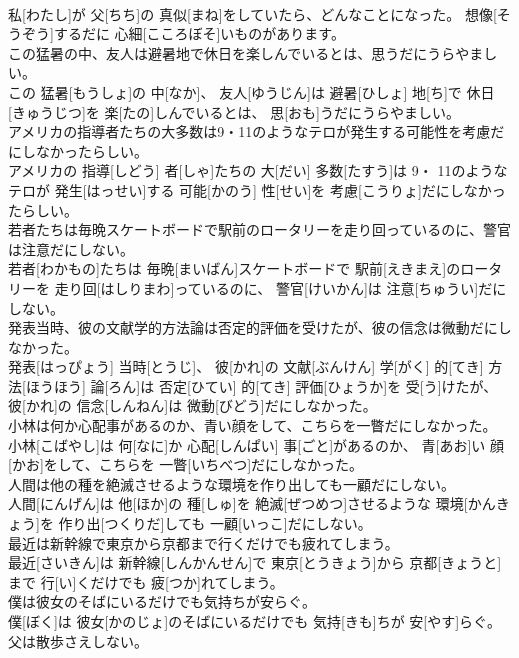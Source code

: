 \documentclass[8pt]{extreport}
\begin{document}
\begin{CJK}{UTF8}{min}
\\	私[わたし]が 父[ちち]の 真似[まね]をしていたら、どんなことになった。 想像[そうぞう]するだに 心細[こころぼそ]いものがあります。
\\	この猛暑の中、友人は避暑地で休日を楽しんでいるとは、思うだにうらやましい。	
\\	この 猛暑[もうしょ]の 中[なか]、 友人[ゆうじん]は 避暑[ひしょ] 地[ち]で 休日[きゅうじつ]を 楽[たの]しんでいるとは、 思[おも]うだにうらやましい。
\\	アメリカの指導者たちの大多数は9・11のようなテロが発生する可能性を考慮だにしなかったらしい。	
\\	アメリカの 指導[しどう] 者[しゃ]たちの 大[だい] 多数[たすう]は 9・ 11のようなテロが 発生[はっせい]する 可能[かのう] 性[せい]を 考慮[こうりょ]だにしなかったらしい。
\\	若者たちは毎晩スケートボードで駅前のロータリーを走り回っているのに、警官は注意だにしない。	
\\	若者[わかもの]たちは 毎晩[まいばん]スケートボードで 駅前[えきまえ]のロータリーを 走り回[はしりまわ]っているのに、 警官[けいかん]は 注意[ちゅうい]だにしない。
\\	発表当時、彼の文献学的方法論は否定的評価を受けたが、彼の信念は微動だにしなかった。	
\\	発表[はっぴょう] 当時[とうじ]、 彼[かれ]の 文献[ぶんけん] 学[がく] 的[てき] 方法[ほうほう] 論[ろん]は 否定[ひてい] 的[てき] 評価[ひょうか]を 受[う]けたが、 彼[かれ]の 信念[しんねん]は 微動[びどう]だにしなかった。
\\	小林は何か心配事があるのか、青い顔をして、こちらを一瞥だにしなかった。	
\\	小林[こばやし]は 何[なに]か 心配[しんぱい] 事[ごと]があるのか、 青[あお]い 顔[かお]をして、こちらを 一瞥[いちべつ]だにしなかった。
\\	人間は他の種を絶滅させるような環境を作り出しても一顧だにしない。	
\\	人間[にんげん]は 他[ほか]の 種[しゅ]を 絶滅[ぜつめつ]させるような 環境[かんきょう]を 作り出[つくりだ]しても 一顧[いっこ]だにしない。
\\	最近は新幹線で東京から京都まで行くだけでも疲れてしまう。	
\\	最近[さいきん]は 新幹線[しんかんせん]で 東京[とうきょう]から 京都[きょうと]まで 行[い]くだけでも 疲[つか]れてしまう。
\\	僕は彼女のそばにいるだけでも気持ちが安らぐ。	
\\	僕[ぼく]は 彼女[かのじょ]のそばにいるだけでも 気持[きも]ちが 安[やす]らぐ。
\\	父は散歩さえしない。	

\end{CJK}
\end{document}
